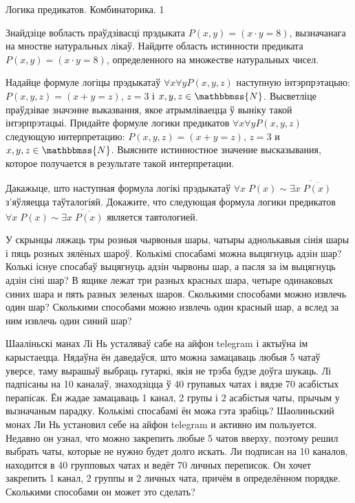 \documentclass[11pt]{article}
\begin{document}
    
{Логика предикатов. Комбинаторика.}
{1}

\begin{problemList}

\problemItemSimple
{Знайдзіце вобласть праўдзівасці прэдыката $P(x, y) = (x \cdot y = 8)$, вызначанага на мностве натуральных лікаў.}
{Найдите область истинности предиката $P(x, y) = (x \cdot y = 8)$, определенного на множестве натуральных чисел.}

\bigskip

\problemItemSimple
{Надайце формуле логіцы прэдыкатаў $\forall x \forall y P(x, y, z)$ наступную інтэрпрэтацыю: $P(x, y, z) = (x + y = z)$, $z = 3$ і $x, y, z \in \mathbbmss{N}$.
Высветліце праўдзівае значэнне выказвання, якое атрымліваецца ў выніку такой інтэрпрэтацыі.}
{Придайте формуле логики предикатов $\forall x \forall y P(x, y, z)$ следующую интерпретацию: $P(x, y, z) = (x + y = z)$, $z = 3$ и $x, y, z \in \mathbbmss{N}$.
Выясните истинностное значение высказывания, которое получается в результате такой интерпретации.}

\bigskip

\problemItemSimple
{Дакажыце, што наступная формула логікі прэдыкатаў $\forall x\;P(x) \sim \overline{\exists x\;\overline{P(x)}}$ з'яўляецца таўталогіяй.}
{Докажите, что следующая формула логики предикатов $\forall x\;P(x) \sim \overline{\exists x\;\overline{P(x)}}$ является тавтологией.}

\bigskip

\problemItemSimple
{У скрынцы ляжаць тры розныя чырвоныя шары, чатыры аднолькавыя сінія шары і пяць розных зялёных шароў.
Колькімі спосабамі можна выцягнуць адзін шар? Колькі існуе спосабаў выцягнуць адзін чырвоны шар,
а пасля за ім выцягнуць адзін сіні шар?}
{В ящике лежат три разных красных шара, четыре одинаковых синих шара и пять разных зеленых шаров.
Сколькими способами можно извлечь один шар?
Сколькими способами можно извлечь один красный шар, а вслед за ним извлечь один синий шар?}

\bigskip

\problemItemSimple
{Шааліньскі манах Лі Нь усталяваў сабе на айфон telegram і актыўна ім карыстаецца.
Нядаўна ён даведаўся, што можна замацаваць любыя 5 чатаў уверсе, таму вырашыў выбраць гутаркі, якія не трэба будзе доўга шукаць.
Лі падпісаны на 10 каналаў, знаходзіцца ў 40 групавых чатах і вядзе 70 асабістых перапісак.
Ён жадае замацаваць 1 канал, 2 групы і 2 асабістыя чаты, прычым у вызначаным парадку.
Колькімі спосабамі ён можа гэта зрабіць?}
{Шаолиньский монах Ли Нь установил себе на айфон telegram и активно им пользуется.
Недавно он узнал, что можно закрепить любые 5 чатов вверху, поэтому решил выбрать чаты, которые не нужно будет долго искать.
Ли подписан на 10 каналов, находится в 40 групповых чатах и ведёт 70 личных переписок.
Он хочет закрепить 1 канал, 2 группы и 2 личных чата, причём в определённом порядке.
Сколькими способами он может это сделать?}


\end{problemList}
\end{document}
